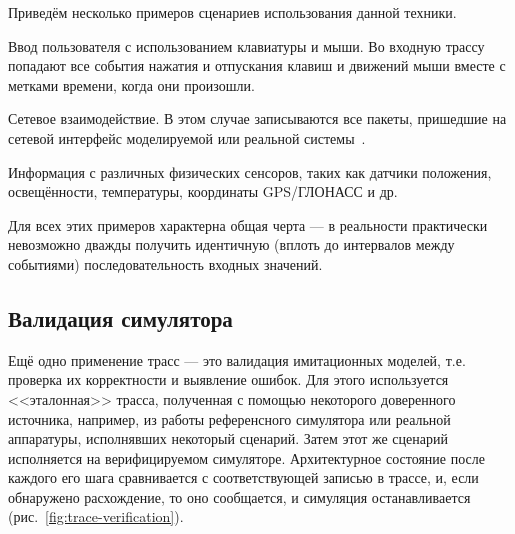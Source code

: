 Приведём несколько примеров сценариев использования данной техники.
\begin{itemize*}
    \item Ввод пользователя с использованием клавиатуры и мыши. Во входную трассу попадают все события нажатия и отпускания клавиш и движений мыши вместе с метками времени, когда они произошли.
    \item Сетевое взаимодействие. В этом случае записываются все пакеты, пришедшие на сетевой интерфейс моделируемой или реальной системы~\cite{network-simulation}.
    \item Информация с различных физических сенсоров, таких как датчики положения, освещённости, температуры, координаты GPS/ГЛОНАСС и др.
\end{itemize*}

Для всех этих примеров характерна общая черта --- в реальности практически невозможно дважды получить идентичную (вплоть до интервалов между событиями) последовательность входных значений. 

\subsection{Валидация симулятора}
Ещё одно применение трасс --- это валидация имитационных моделей, т.е. проверка их корректности и выявление ошибок. Для этого используется <<эталонная>> трасса, полученная с помощью некоторого доверенного источника, например, из работы референсного симулятора или реальной аппаратуры, исполнявших некоторый сценарий. Затем этот же сценарий исполняется на верифицируемом симуляторе. Архитектурное состояние после каждого его шага сравнивается с соответствующей записью в трассе, и, если обнаружено расхождение, то оно сообщается, и симуляция останавливается (рис.~\ref{fig:trace-verification}).

